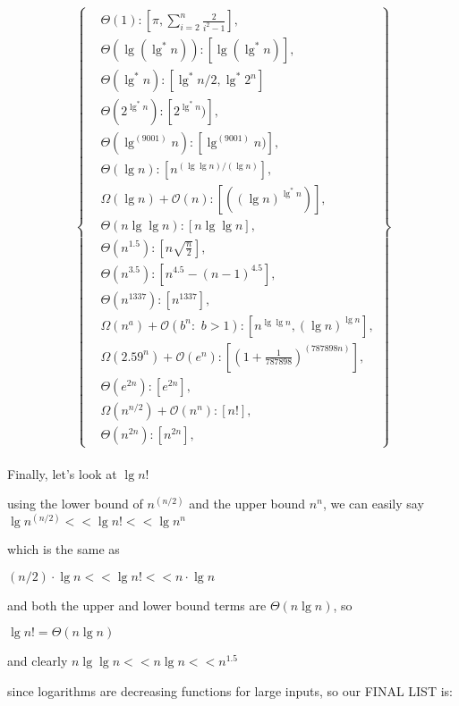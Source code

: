 \documentclass[11pt,fleqn]{article}
\theoremstyle{definition}
\theoremstyle{remark}
\begin{document}
\[
\left\{
\begin{aligned}
& \Theta(1): [\pi, \sum_{i=2}^{n} \frac{2}{i^2 - 1}],\\
& \Theta(\lg(\lg^*n)): [\lg(\lg^*n)],\\
& \Theta(\lg^* n): [\lg^* n/2, \lg^* 2^n]\\
& \Theta(2^{\lg^*n}): [2^{\lg^*n})],\\
& \Theta(\lg^{(9001)} n): [\lg^{(9001)} n)],\\
& \Theta(\lg n): [n^{({\lg \lg n})/({\lg n})}],\\
& \Omega(\lg n) + \mathcal{O}(n): [({(\lg n)}^{\lg^*{n}})],\\
& \Theta(n\lg \lg n): [n\lg \lg n],\\
& \Theta(n^{1.5}): [n\sqrt{\frac{n}{2}}],\\
& \Theta(n^{3.5}): [n^{4.5} - (n - 1)^{4.5}],\\ 
& \Theta(n^{1337}): [n^{1337}],\\
& \Omega(n^a) + \mathcal{O}(b^n:\,\, b > 1): [n^{\lg \lg n}, (\lg n)^{\lg n}],\\
& \Omega(2.59^n) + \mathcal{O}(e^n): [{(1 + \frac{1}{787898})}^{(787898n)}],\\
& \Theta(e^{2n}): [e^{2n}],\\
& \Omega(n^{n/2}) + \mathcal{O}(n^n): [n!],\\
& \Theta(n^{2n}): [n^{2n}],
\end{aligned}
\right\}
\]\\

Finally, let's look at $\lg n!$

using the lower bound of $n^{(n/2)}$ and the upper bound $n^n$, we can easily say\\

$\lg n^{(n/2)} << \lg n! << \lg n^n$

which is the same as

$(n/2) \cdot \lg n << \lg n! << n \cdot \lg n$

and both the upper and lower bound terms are $\Theta(n\lg n)$, so

$\lg n! = \Theta(n\lg n)$

and clearly $n\lg \lg n << n\lg n << n^{1.5}$

since logarithms are decreasing functions for large inputs, so our FINAL LIST is:
\end{document}
